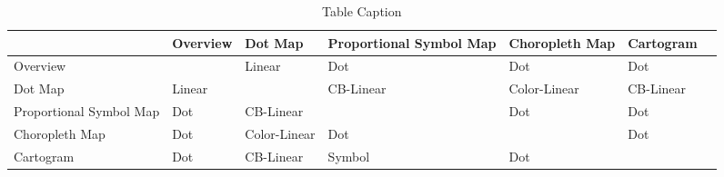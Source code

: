 \begin{table}[!htp]
    \begin{tabular}{M{22mm}||M{22mm} | M{22mm} | M{22mm} | M{22mm} | M{22mm} N}

    ~                       & Overview & Dot Map & Proportional Symbol Map & Choropleth Map & Cartogram &\\[4ex] \hline \hline

    Overview                & ~        & Linear       & Dot                       & Dot              & Dot         &\\[4ex] \hline

    Dot Map                 & Linear        & ~       & CB-Linear                       & Color-Linear              & CB-Linear         &\\[4ex] \hline

    Proportional Symbol Map & Dot        & CB-Linear       & ~                       & Dot              & Dot         &\\[4ex] \hline

    Choropleth Map          & Dot        & Color-Linear       & Dot                       & ~              & Dot         &\\[4ex] \hline

    Cartogram               & Dot        & CB-Linear       & Symbol                       & Dot              & ~         &\\[4ex]
    \end{tabular}
    \caption {Table Caption}
\end{table}









